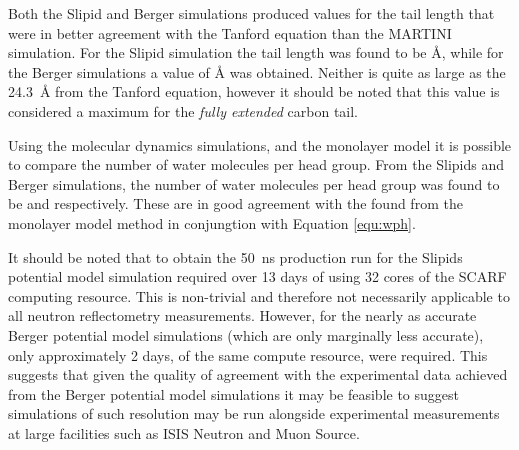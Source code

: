 \documentclass[amsmath,amssymb,twocolumn,superscriptaddress]{revtex4-1}
\begin{document}
Both the Slipid and Berger simulations produced values for the tail length
that were in better agreement with the Tanford equation than the
MARTINI simulation.
For the Slipid simulation the tail length was found to be
\si{\angstrom}, while for the
Berger simulations a value of
\si{\angstrom} was obtained.
Neither is quite as large as the \SI{24.3}{\angstrom} from the Tanford
equation, however it should be noted that this value is considered a
maximum for the \emph{fully extended} carbon tail.

Using the molecular dynamics simulations, and the monolayer model it is
possible to compare the number of water molecules per head group.
From the Slipids and Berger simulations, the number of water molecules per
head group was found to be 
and  respectively.
These are in good agreement with the
 found from the monolayer model
method in conjungtion with Equation \ref{equ:wph}.

It should be noted that to obtain the \SI{50}{\nano\second} production run
for the Slipids potential model simulation required over 13 days of using 32
cores of the SCARF computing resource.
This is non-trivial and therefore not necessarily applicable to all neutron
reflectometry measurements.
However, for the nearly as accurate Berger potential model simulations
(which are only marginally less accurate), only approximately 2 days, of the
same compute resource, were required.
This suggests that given the quality of agreement with the experimental data
achieved from the Berger potential model simulations it may be feasible to
suggest simulations of such resolution may be run alongside experimental
measurements at large facilities such as ISIS Neutron and Muon Source.
\end{document}
